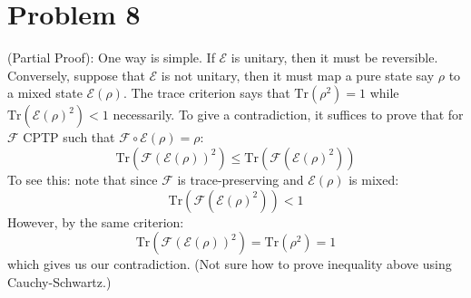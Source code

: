 \documentclass[12pt]{article}%
\begin{document}
\section*{Problem 8}
(Partial Proof): One way is simple. If $\mathcal{E}$ is unitary, then it must be reversible. Conversely, suppose that $\mathcal{E}$ is not unitary, then it must map a pure state say $\rho$ to a mixed state $\mathcal{E}(\rho)$. The trace criterion says that
$\text{Tr}(\rho^2) = 1$ while $\text{Tr}(\mathcal{E}(\rho)^2) < 1$ necessarily. To give a contradiction, it suffices to prove that for $\mathcal{F}$ CPTP such that $\mathcal{F} \circ \mathcal{E}(\rho) = \rho$:
$$ \text{Tr}(\mathcal{F}(\mathcal{E}(\rho))^2) \leq \text{Tr}(\mathcal{F}(\mathcal{E}(\rho)^2)) $$
To see this: note that since $\mathcal{F}$ is trace-preserving and $\mathcal{E}(\rho)$ is mixed:
$$\text{Tr}(\mathcal{F}(\mathcal{E}(\rho)^2)) < 1$$ However, by the same criterion:
$$\text{Tr}(\mathcal{F}(\mathcal{E}(\rho))^2) = \text{Tr}(\rho^2) = 1 $$
which gives us our contradiction. (Not sure how to prove inequality above using Cauchy-Schwartz.)
\end{document}
